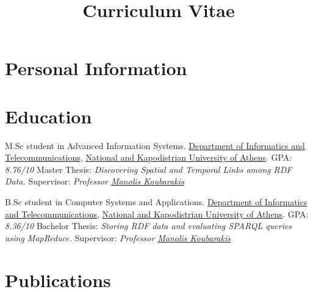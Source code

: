 \documentclass[11pt,a4paper,roman]{moderncv} %
\title{Curriculum Vitae}
\begin{document}
\makecvtitle %




\section{Personal Information}





\section{Education}

{M.Sc student in Advanced Information Systems.}
{\href{http://www.di.uoa.gr/eng}{Department of Informatics and Telecommunications}, \href{http://en.uoa.gr}{National and Kapodistrian University of Athens}.}
{GPA: \emph{8.76/10}}
{Master Thesis: \emph{Discovering Spatial and Temporal Links among RDF Data.}}
{Supervisor: \emph{Professor \href{http://cgi.di.uoa.gr/~koubarak/}{Manolis Koubarakis}}}

{B.Sc student in Computer Systems and Applications.}
{\href{http://www.di.uoa.gr/eng}{Department of Informatics and Telecommunications}, \href{http://en.uoa.gr}{National and Kapodistrian University of Athens}.}
{GPA: \emph{8.36/10}}
{Bachelor Thesis: \emph{Storing RDF data and evaluating SPARQL queries using MapReduce.}}
{Supervisor: \emph{Professor \href{http://cgi.di.uoa.gr/~koubarak/}{Manolis Koubarakis}}}



\section{Publications}
\end{document}
